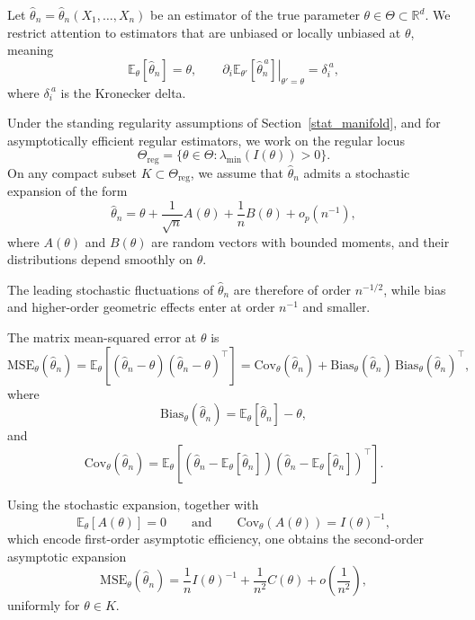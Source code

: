 \documentclass[11pt,letterpaper]{amsart}
\numberwithin{equation}{section}
\theoremstyle{plain}
\theoremstyle{definition}
\theoremstyle{remark}
\begin{document}
Let \(\hat\theta_n=\hat\theta_n(X_1,\dots,X_n)\) be an estimator of the true parameter \(\theta\in\Theta\subset\mathbb{R}^d\). We restrict attention to estimators that are unbiased or locally unbiased at \(\theta\), meaning
\begin{equation*}
\mathbb{E}_\theta[\hat\theta_n]=\theta,
\qquad
\left.\partial_i \mathbb{E}_{\theta'}[\hat\theta_n^{\,a}]\right|_{\theta'=\theta}
=
\delta_i^{\ a},
\end{equation*}
where \(\delta_i^{\ a}\) is the Kronecker delta.

Under the standing regularity assumptions of Section~\ref{stat_manifold}, and for asymptotically efficient regular estimators, we work on the regular locus
\begin{equation*}
\Theta_{\mathrm{reg}}
=
\{\theta\in\Theta:\lambda_{\min}(I(\theta))>0\}.
\end{equation*}
On any compact subset \(K\subset\Theta_{\mathrm{reg}}\), we assume that \(\hat\theta_n\) admits a stochastic expansion of the form
\begin{equation*}
\hat\theta_n
=
\theta
+
\frac{1}{\sqrt n}A(\theta)
+
\frac{1}{n}B(\theta)
+
o_p(n^{-1}),
\end{equation*}
where \(A(\theta)\) and \(B(\theta)\) are random vectors with bounded moments, and their distributions depend smoothly on \(\theta\).

The leading stochastic fluctuations of \(\hat\theta_n\) are therefore of order \(n^{-1/2}\), while bias and higher-order geometric effects enter at order \(n^{-1}\) and smaller.

The matrix mean-squared error at \(\theta\) is
\begin{equation*}
\mathrm{MSE}_\theta(\hat\theta_n)
=
\mathbb{E}_\theta\!\left[
(\hat\theta_n-\theta)(\hat\theta_n-\theta)^\top
\right]
=
\mathrm{Cov}_\theta(\hat\theta_n)
+
\mathrm{Bias}_\theta(\hat\theta_n)\,
\mathrm{Bias}_\theta(\hat\theta_n)^\top,
\end{equation*}
where
\begin{equation*}
\mathrm{Bias}_\theta(\hat\theta_n)
=
\mathbb{E}_\theta[\hat\theta_n]-\theta,
\end{equation*}
and
\begin{equation*}
\mathrm{Cov}_\theta(\hat\theta_n)
=
\mathbb{E}_\theta\!\left[
(\hat\theta_n-\mathbb{E}_\theta[\hat\theta_n])
(\hat\theta_n-\mathbb{E}_\theta[\hat\theta_n])^\top
\right].
\end{equation*}

Using the stochastic expansion, together with
\[
\mathbb{E}_\theta[A(\theta)]=0
\qquad\text{and}\qquad
\mathrm{Cov}_\theta(A(\theta))=I(\theta)^{-1},
\]
which encode first-order asymptotic efficiency, one obtains the second-order asymptotic expansion
\begin{equation*}
\mathrm{MSE}_\theta(\hat\theta_n)
=
\frac{1}{n}I(\theta)^{-1}
+
\frac{1}{n^2}C(\theta)
+
o\!\left(\frac{1}{n^2}\right),
\end{equation*}
uniformly for \(\theta\in K\).
\end{document}
